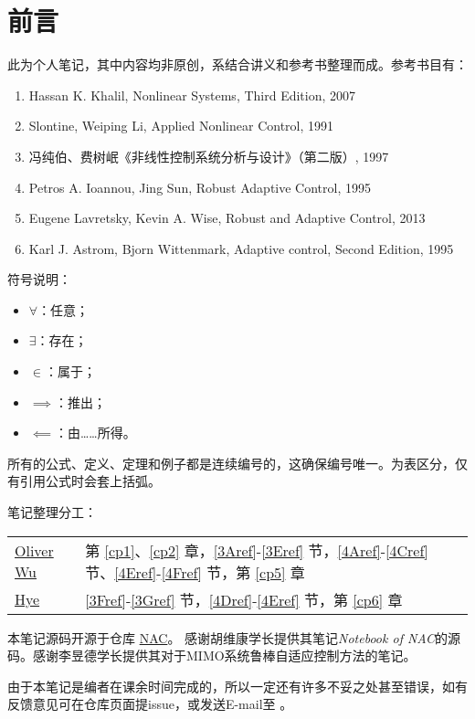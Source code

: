 \chapter*{前言}
此为个人笔记，其中内容均非原创，系结合讲义和参考书整理而成。参考书目有：
\begin{enumerate}
    \item Hassan K. Khalil, Nonlinear Systems, Third Edition, 2007
    \item Slontine, Weiping Li, Applied   Nonlinear    Control, 1991
    \item 冯纯伯、费树岷《非线性控制系统分析与设计》（第二版）, 1997
    \item Petros A. Ioannou, Jing Sun, Robust Adaptive Control, 1995
    \item Eugene Lavretsky, Kevin A. Wise, Robust and Adaptive Control, 2013
    \item Karl J. Astrom, Bjorn Wittenmark, Adaptive control, Second Edition, 1995
\end{enumerate}

符号说明：
\begin{itemize}
    \item $\forall$：任意；
    \item $\exists$：存在；
    \item $\in$：属于；
    \item $\implies$：推出；
    \item $\impliedby$：由……所得。
\end{itemize}

所有的公式、定义、定理和例子都是连续编号的，这确保编号唯一。为表区分，仅有引用公式时会套上括弧。

笔记整理分工：
\begin{table*}[htbp]
  \centering
  \setcellgapes{4pt}
  \makegapedcells
  \begin{tabular}{p{2.0cm}p{12.0cm}}
    \hline
    \href{https://github.com/OliverWu515}{Oliver Wu} & 第 \ref{cp1}、\ref{cp2} 章，\ref{3Aref}-\ref{3Eref} 节，\ref{4Aref}-\ref{4Cref} 节、\ref{4Eref}-\ref{4Fref} 节，第 \ref{cp5} 章\\
    \href{https://github.com/Co-ding-Man}{Hye} & \ref{3Fref}-\ref{3Gref} 节，\ref{4Dref}-\ref{4Eref} 节，第 \ref{cp6} 章\\
    \hline
  \end{tabular}
\end{table*}

本笔记源码开源于仓库 \href{https://github.com/OliverWu515/NAC}{NAC}。
感谢胡维康学长提供其笔记{\it Notebook of NAC}的源码。感谢李昱德学长提供其对于MIMO系统鲁棒自适应控制方法的笔记。

由于本笔记是编者在课余时间完成的，所以一定还有许多不妥之处甚至错误，如有反馈意见可在仓库页面提issue，或发送E-mail至 。